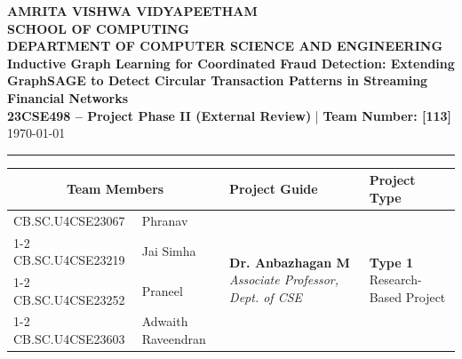 \documentclass[11pt, a4paper]{article}
\begin{document}
\noindent
\begin{minipage}{\textwidth}
    \centering
    {\Large \textbf{\textcolor{amritaMaroon}{
    AMRITA VISHWA VIDYAPEETHAM \\
    SCHOOL OF COMPUTING \\
    DEPARTMENT OF COMPUTER SCIENCE AND ENGINEERING \\
    }}}
    \vspace{0.2cm}
    {\large \textbf{Inductive Graph Learning for Coordinated Fraud Detection: Extending GraphSAGE to Detect Circular Transaction Patterns in Streaming Financial Networks}} \\[0.15cm]
    \textbf{23CSE498 -- Project Phase II (External Review)} \quad | \quad \textbf{Team Number: [113]} \\
    \today
\end{minipage}

\vspace{0.3cm}
\hrule
\vspace{0.3cm}

\noindent
\begin{center}
    \renewcommand{\arraystretch}{1.35}
    \setlength{\tabcolsep}{6pt}
    \begin{tabular}{|l|p{4.8cm}|p{4.6cm}|p{3.2cm}|}
        \hline
        \multicolumn{2}{|c|}{\textbf{Team Members}} & \textbf{Project Guide} & \textbf{Project Type} \\
        \hline
        \small CB.SC.U4CSE23067 & \small \raggedright Phranav &
        \multirow{4}{=}{\raggedright \small \textbf{Dr. Anbazhagan M} \newline \textit{Associate Professor, \newline Dept. of CSE}} &
        \multirow{4}{=}{\raggedright \small \textbf{Type 1} \newline Research-Based Project} \\ \cline{1-2}
        \small CB.SC.U4CSE23219 & \small Jai Simha & & \\ \cline{1-2}
        \small CB.SC.U4CSE23252 & \small Praneel & & \\ \cline{1-2}
        \small CB.SC.U4CSE23603 & \small Adwaith Raveendran & & \\
        \hline
    \end{tabular}
\end{center}
\vspace{0.2cm}
\end{document}
